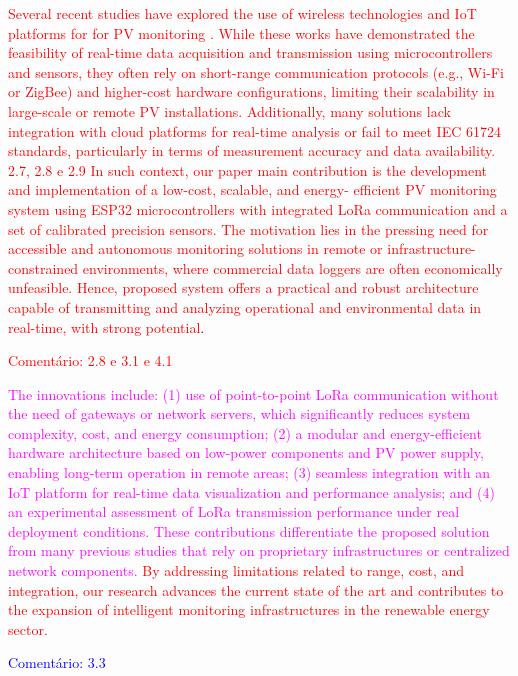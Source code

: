 \documentclass{ieeeaccess}
\begin{document}
\textcolor{red}{
Several recent studies have explored the use of wireless technologies and IoT platforms for for PV monitoring \cite{dupont2018internet, pereira2019iot, liang2020performance, araripe2024monitoramento}. While these works have demonstrated the feasibility of real-time data acquisition and transmission using microcontrollers and sensors, they often rely on short-range communication protocols (e.g., Wi-Fi or ZigBee) and higher-cost hardware configurations, limiting their scalability in large-scale or remote PV installations. Additionally, many solutions lack integration with cloud platforms for real-time analysis or fail to meet  IEC 61724 standards, particularly in terms of measurement accuracy and data availability.
}
\textcolor{red}{2.7, 2.8 e 2.9}
\textcolor{red}{
In such context, our paper main contribution is the development and implementation of a low-cost, scalable, and energy- efficient PV monitoring system using ESP32 microcontrollers with integrated LoRa communication and a set of calibrated precision sensors. The motivation lies in the pressing need for accessible and autonomous monitoring solutions in remote or infrastructure-constrained environments, where commercial data loggers are often economically unfeasible. Hence, proposed system offers a practical and robust architecture capable of transmitting and analyzing operational and environmental data in real-time, with strong potential}.

\textcolor{red}{Comentário: 2.8 e 3.1 e 4.1}

\textcolor{magenta}{ The innovations include: (1) use of point-to-point LoRa communication without the need of gateways or network servers, which significantly reduces system complexity, cost, and energy consumption; (2) a modular and energy-efficient hardware architecture based on low-power components and PV power supply, enabling long-term operation in remote areas; (3) seamless integration with an IoT platform for real-time data visualization and performance analysis; and (4) an experimental assessment of LoRa transmission performance under real deployment conditions. These contributions differentiate the proposed solution from many previous studies that rely on proprietary infrastructures or centralized network components.} \textcolor{red}{
By addressing limitations related to range, cost, and integration, our research advances the current state of the art and contributes to the expansion of intelligent monitoring infrastructures in the renewable energy sector.
}

\textcolor{blue}{Comentário: 3.3}
\end{document}
